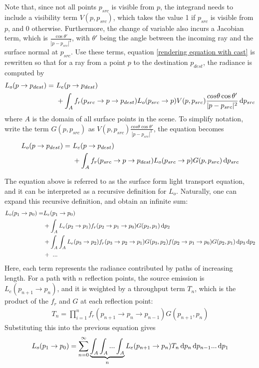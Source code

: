 Note that, since not all points $p_{src}$ is visible from $p$, the integrand needs to include a visibility term $V(p,p_{src})$, which takes the value 1 if $p_{src}$ is visible from $p$, and 0 otherwise. Furthermore, the change of variable also incurs a Jacobian term, which is $\frac{\cos\theta'}{|p-p_{src}|^2}$, with $\theta'$ being the angle between the incoming ray and the surface normal at $p_{src}$. Use these terms, equation \ref{rendering equation with cast} is rewritten so that for a ray from a point $p$ to the destination $p_{dest}$, the radiance is computed by
\begin{align*}
    L_o(p\to p_{dest}) =~ &L_e(p\to p_{dest}) \\
    &+ \int_A f_r(p_{src}\to p\to p_{dest}) L_o(p_{src}\to p)  V(p,p_{src}) \frac{cos\theta\cos\theta'}{|p-p_{src}|^2} \,\mathrm{d} p_{src}
\end{align*} 
where $A$ is the domain of all surface points in the scene. To simplify notation, write the term $G(p,p_{src})$ as $V(p,p_{src}) \frac{cos\theta\cos\theta'}{|p-p_{src}|^2}$, the equation becomes
\begin{align*}
    L_o(p\to p_{dest}) =~ &L_e(p\to p_{dest}) \\
    &+ \int_A f_r(p_{src}\to p\to p_{dest}) L_o(p_{src}\to p)  G(p,p_{src})  \,\mathrm{d} p_{src}
\end{align*} 

The equation above is referred to as the surface form light transport equation, and it can be interpreted as a recursive definition for $L_o$. Naturally, one can expand this recursive definition, and obtain an infinite sum:
\begin{align*}
    L_o(p_1\to p_0) =
    &L_e(p_1\to p_0)\\
    &+ \int_A L_e(p_2\to p_1)f_r(p_2\to p_1\to p_0)G(p_2,p_1) \,\mathrm{d} p_2\\
    &+ \int_A \int_A L_e(p_3\to p_2)f_r(p_3\to p_2\to p_1) G(p_3,p_2)f(p_2\to p_1\to p_0)G(p_2,p_1) \,\mathrm{d} p_3 \,\mathrm{d} p_2\\
    &+~...
\end{align*}
Here, each term represents the radiance contributed by paths of increasing length. For a path with $n$ reflection points, the source emission is $L_e(p_{n+1}\to p_{n})$, and it is weighted by a throughput term $T_n$, which is the product of the $f_r$ and $G$ at each reflection point:
\begin{align*}
    T_n = \prod_{i=1}^{n} f_r(p_{n+1}\to p_n\to p_{n-1})G(p_{n+1},p_n)
\end{align*}
Substituting this into the previous equation gives
\begin{align*}
    L_o(p_1\to p_0) = \sum_{n=0}^{\infty} \underbrace{\int_A \int_A...\int_A}_{n} L_e(p_{n+1}\to p_{n})T_n \,\mathrm{d} p_{n}\,\mathrm{d} p_{n-1}...\,\mathrm{d} p_1
\end{align*}


